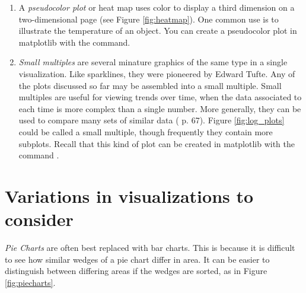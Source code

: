 \begin{enumerate}
\item A \emph{pseudocolor plot} or heat map uses color to display a third dimension on a two-dimensional page (see Figure \ref{fig:heatmap}). 
One common use is to illustrate the temperature of an object. 
You can create a pseudocolor plot in matplotlib with the  command.

\item \emph{Small multiples} are several minature graphics of the same type in a single visualization. 
Like sparklines, they were pioneered by Edward Tufte. Any of the plots discussed so far may be assembled into a small multiple. 
Small multiples are useful for viewing trends over time, when the data associated to each time is more complex than a single number. 
More generally, they can be used to compare many sets of similar data (\cite{tufte1990} p. 67). 
Figure \ref{fig:log_plots} could be called a small multiple, though frequently they contain more subplots. 
Recall that this kind of plot can be created in matplotlib with the command .
\end{enumerate}

\section*{Variations in visualizations to consider}

\emph{Pie Charts} are often best replaced with bar charts. This is because it is difficult to see how similar wedges of a pie chart differ in area. It can be easier to distinguish between differing areas if the wedges are sorted, as in Figure \ref{fig:piecharts}. 

